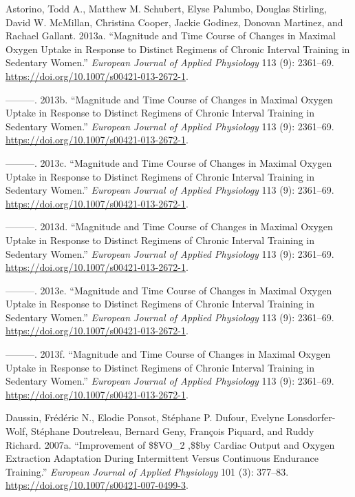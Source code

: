 \documentclass[
  letterpaper,
  DIV=11,
  numbers=noendperiod]{scrartcl}
\newlength{\cslhangindent}
\newlength{\cslentryspacingunit} %
\newenvironment{CSLReferences}[2] %
 {%
  \setlength{\parindent}{0pt}
  \ifodd #1
  \let\oldpar\par
  \def\par{\hangindent=\cslhangindent\oldpar}
  \fi
  \setlength{\parskip}{#2\cslentryspacingunit}
 }%
 {}
\begin{document}
\hypertarget{refs}{}
\begin{CSLReferences}{1}{0}
\leavevmode{}%
Astorino, Todd A., Matthew M. Schubert, Elyse Palumbo, Douglas Stirling,
David W. McMillan, Christina Cooper, Jackie Godinez, Donovan Martinez,
and Rachael Gallant. 2013a. {``Magnitude and Time Course of Changes in
Maximal Oxygen Uptake in Response to Distinct Regimens of Chronic
Interval Training in Sedentary Women.''} \emph{European Journal of
Applied Physiology} 113 (9): 2361--69.
\url{https://doi.org/10.1007/s00421-013-2672-1}.

\leavevmode{}%
---------. 2013b. {``Magnitude and Time Course of Changes in Maximal
Oxygen Uptake in Response to Distinct Regimens of Chronic Interval
Training in Sedentary Women.''} \emph{European Journal of Applied
Physiology} 113 (9): 2361--69.
\url{https://doi.org/10.1007/s00421-013-2672-1}.

\leavevmode{}%
---------. 2013c. {``Magnitude and Time Course of Changes in Maximal
Oxygen Uptake in Response to Distinct Regimens of Chronic Interval
Training in Sedentary Women.''} \emph{European Journal of Applied
Physiology} 113 (9): 2361--69.
\url{https://doi.org/10.1007/s00421-013-2672-1}.

\leavevmode{}%
---------. 2013d. {``Magnitude and Time Course of Changes in Maximal
Oxygen Uptake in Response to Distinct Regimens of Chronic Interval
Training in Sedentary Women.''} \emph{European Journal of Applied
Physiology} 113 (9): 2361--69.
\url{https://doi.org/10.1007/s00421-013-2672-1}.

\leavevmode{}%
---------. 2013e. {``Magnitude and Time Course of Changes in Maximal
Oxygen Uptake in Response to Distinct Regimens of Chronic Interval
Training in Sedentary Women.''} \emph{European Journal of Applied
Physiology} 113 (9): 2361--69.
\url{https://doi.org/10.1007/s00421-013-2672-1}.

\leavevmode{}%
---------. 2013f. {``Magnitude and Time Course of Changes in Maximal
Oxygen Uptake in Response to Distinct Regimens of Chronic Interval
Training in Sedentary Women.''} \emph{European Journal of Applied
Physiology} 113 (9): 2361--69.
\url{https://doi.org/10.1007/s00421-013-2672-1}.

\leavevmode{}%
Daussin, Frédéric N., Elodie Ponsot, Stéphane P. Dufour, Evelyne
Lonsdorfer-Wolf, Stéphane Doutreleau, Bernard Geny, François Piquard,
and Ruddy Richard. 2007a. {``Improvement of
{\$}{\$}\dot{\textbraceleft}V{\textbraceright}\hbox{\textbraceleft}O{\textbraceright}{\_}{\textbraceleft}2
\max{\textbraceright},{\$}{\$}by Cardiac Output and Oxygen Extraction
Adaptation During Intermittent Versus Continuous Endurance Training.''}
\emph{European Journal of Applied Physiology} 101 (3): 377--83.
\url{https://doi.org/10.1007/s00421-007-0499-3}.


\end{CSLReferences}
\end{document}
